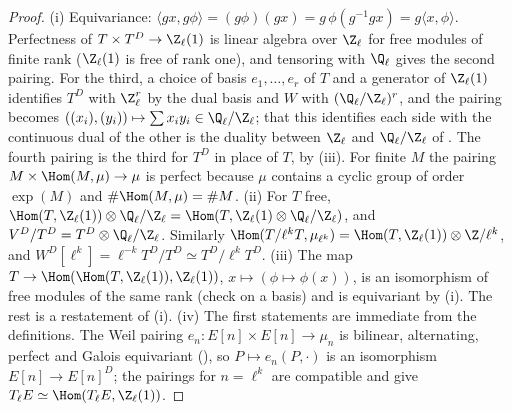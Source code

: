 \begin{proof}
(i) Equivariance: $\langle gx,g\phi\rangle=(g\phi)(gx)=g\,\phi(g^{-1}gx)=g\langle x,\phi\rangle$. Perfectness of $T\times T^D\to\Z_\ell(1)$ is linear algebra over $\Z_\ell$ for
free modules of finite rank ($\Z_\ell(1)$ is free of rank one), and tensoring with $\Q_\ell$ gives the second pairing. For the third, a choice of basis $e_1,\dots,e_r$ of $T$
and a generator of $\Z_\ell(1)$ identifies $T^D$ with $\Z_\ell^r$ by the dual basis and $W$ with $(\Q_\ell/\Z_\ell)^r$, and the pairing becomes
$((x_i),(y_i))\mapsto\sum x_iy_i\in\Q_\ell/\Z_\ell$; that this identifies each side with the continuous dual of the other is the duality between $\Z_\ell$ and
$\Q_\ell/\Z_\ell$ of . The fourth pairing is the third for $T^D$ in place of $T$, by (iii). For finite $M$ the pairing $M\times\Hom(M,\mu)\to\mu$ is
perfect because $\mu$ contains a cyclic group of order $\exp(M)$ and $\#\Hom(M,\mu)=\#M$.
(ii) For $T$ free, $\Hom(T,\Z_\ell(1))\otimes\Q_\ell/\Z_\ell=\Hom(T,\Z_\ell(1)\otimes\Q_\ell/\Z_\ell)$, and $V^D/T^D=T^D\otimes\Q_\ell/\Z_\ell$. Similarly
$\Hom(T/\ell^kT,\mu_{\ell^k})=\Hom(T,\Z_\ell(1))\otimes\Z/\ell^k$, and $W^D[\ell^k]=\ell^{-k}T^D/T^D\simeq T^D/\ell^kT^D$.
(iii) The map $T\to\Hom(\Hom(T,\Z_\ell(1)),\Z_\ell(1))$, $x\mapsto(\phi\mapsto\phi(x))$, is an isomorphism of free modules of the same rank (check on a basis) and is
equivariant by (i). The rest is a restatement of (i).
(iv) The first statements are immediate from the definitions. The Weil pairing $e_n\colon E[n]\times E[n]\to\mu_n$ is bilinear, alternating, perfect and
Galois equivariant (), so $P\mapsto e_n(P,\cdot)$ is an isomorphism $E[n]\to E[n]^D$; the pairings for $n=\ell^k$ are compatible and give
$T_\ell E\simeq\Hom(T_\ell E,\Z_\ell(1))$.
\end{proof}

